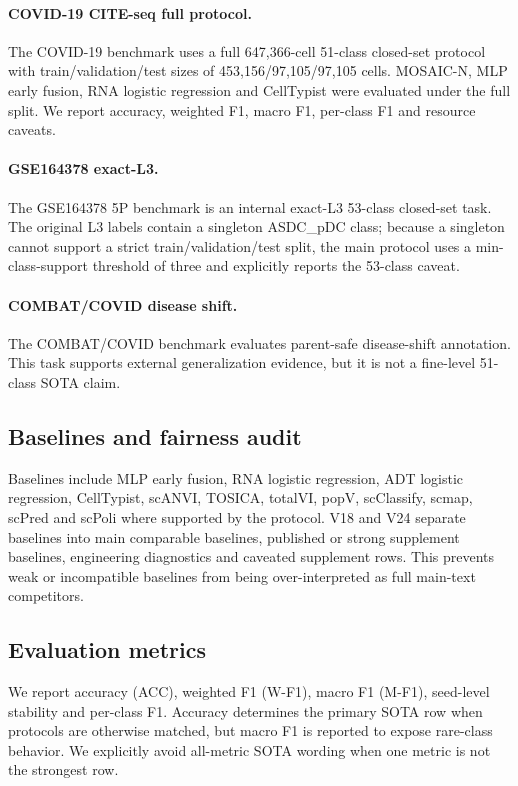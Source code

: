 \documentclass[unnumsec,webpdf,contemporary,large,numbered]{oup-authoring-template}
\begin{document}
\paragraph{COVID-19 CITE-seq full protocol.} The COVID-19 benchmark uses a full 647,366-cell 51-class closed-set protocol with train/validation/test sizes of 453,156/97,105/97,105 cells. MOSAIC-N, MLP early fusion, RNA logistic regression and CellTypist were evaluated under the full split. We report accuracy, weighted F1, macro F1, per-class F1 and resource caveats.

\paragraph{GSE164378 exact-L3.} The GSE164378 5P benchmark is an internal exact-L3 53-class closed-set task. The original L3 labels contain a singleton ASDC\_pDC class; because a singleton cannot support a strict train/validation/test split, the main protocol uses a min-class-support threshold of three and explicitly reports the 53-class caveat.

\paragraph{COMBAT/COVID disease shift.} The COMBAT/COVID benchmark evaluates parent-safe disease-shift annotation. This task supports external generalization evidence, but it is not a fine-level 51-class SOTA claim.

\subsection{Baselines and fairness audit}

Baselines include MLP early fusion, RNA logistic regression, ADT logistic regression, CellTypist, scANVI, TOSICA, totalVI, popV, scClassify, scmap, scPred and scPoli where supported by the protocol. V18 and V24 separate baselines into main comparable baselines, published or strong supplement baselines, engineering diagnostics and caveated supplement rows. This prevents weak or incompatible baselines from being over-interpreted as full main-text competitors.

\subsection{Evaluation metrics}

We report accuracy (ACC), weighted F1 (W-F1), macro F1 (M-F1), seed-level stability and per-class F1. Accuracy determines the primary SOTA row when protocols are otherwise matched, but macro F1 is reported to expose rare-class behavior. We explicitly avoid all-metric SOTA wording when one metric is not the strongest row.
\end{document}
